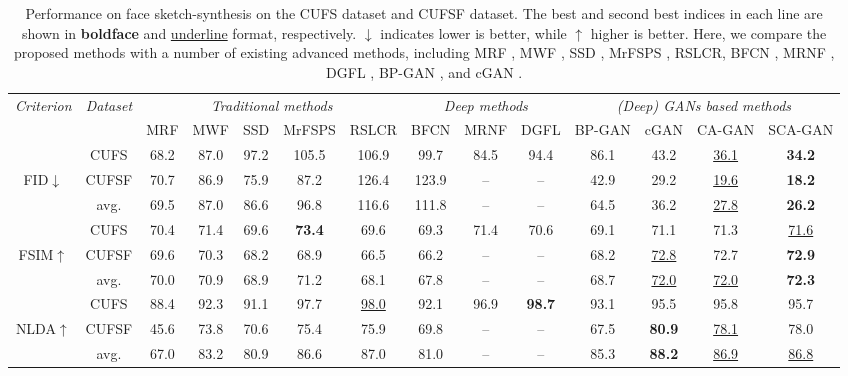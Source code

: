 \documentclass[journal]{IEEEtran}
\begin{document}
\begin{table*}
\centering
\caption{Performance on face sketch-synthesis on the CUFS dataset and CUFSF dataset. The best and second best indices in each line are shown in \textbf{boldface} and \underline{underline} format, respectively. $\downarrow$ indicates lower is better, while $\uparrow$ higher is better. Here, we compare the proposed methods with a number of existing advanced methods, including MRF \cite{Wang2009Face}, MWF \cite{MWF}, SSD \cite{Song2014Real}, MrFSPS \cite{Peng2016Multiple}, RSLCR\cite{Wang2017RSLCR}, BFCN \cite{BFCN}, MRNF \cite{Zhang2018Markov}, DGFL \cite{Zhu2017Deep}, BP-GAN \cite{wang2017bpgan}, and cGAN \cite{Isola2017Pix2Pix}.}
\label{tab:pfm_sketch}
\begin{tabular}{c|c|ccccc|ccc|cccc}
\toprule		
\textit{Criterion} &	\textit{Dataset} & \multicolumn{5}{c|}{\textit{Traditional methods}}	& \multicolumn{3}{c|}{\textit{Deep methods}}	& \multicolumn{4}{c}{\textit{(Deep) GANs based methods}}	\\
&		&	MRF	&	MWF	&	SSD &	MrFSPS	&	RSLCR	&	BFCN	&	MRNF	&	DGFL  &	BP-GAN	&	cGAN	&	CA-GAN & SCA-GAN	\\
\midrule
	& CUFS     &	68.2 	&	87.0 	&	97.2 &	105.5 	&	106.9 	&	99.7	&	84.5 	&	94.4 &	86.1&	43.2 &	\underline{36.1} &	\textbf{34.2}\\
FID$\downarrow$	& CUFSF    & 70.7	&	86.9	&	75.9	&	87.2 &	126.4	&	123.9	&	--	&	--	&	42.9	&	29.2	&	\underline{19.6}	&	\textbf{18.2}\\
& avg. &  69.5 & 87.0 & 86.6 &  96.8  & 116.6 & 111.8 & -- & -- & 64.5 & 36.2 & \underline{27.8} & \textbf{26.2}  \\

\midrule
	&	CUFS	&	70.4	&	71.4	&	69.6	&	\textbf{73.4} 		&	69.6 	&	69.3 	&	71.4 	&	70.6 &	69.1 	&	71.1 	&	71.3 	&	\underline{71.6} 	\\
FSIM$\uparrow$&	CUFSF	&	69.6	&	70.3	&	68.2	& 68.9	&	66.5 	&	66.2 	&--	&--	&	68.2 &	\underline{72.8} 	&	 72.7	&	\textbf{72.9} 	\\
& avg. &  70.0 & 70.9 & 68.9 & 71.2 & 68.1 & 67.8 & -- & -- & 68.7 & \underline{72.0} & \underline{72.0} & \textbf{72.3}  \\

\midrule
	& CUFS &	88.4 	&	92.3 	&	91.1 &	97.7 &	\underline{98.0} 	&	92.1	&	96.9 	&	\textbf{98.7} &	93.1 	&	95.5 	&	95.8 	&	95.7 \\
NLDA$\uparrow$&	CUFSF	&	45.6	&	73.8	&	70.6&	75.4 	&	75.9 	&	69.8 	&--	&--	&	67.5 	&	\textbf{80.9} 	&	\underline{78.1} 	&	78.0 	\\
& avg. & 67.0 & 83.2 & 80.9 & 86.6 & 87.0 & 81.0 & -- & -- & 85.3 & \textbf{88.2} & \underline{86.9} & \underline{86.8} \\
\bottomrule	
\end{tabular}
\vspace{-0.4cm}
\end{table*}
\end{document}

